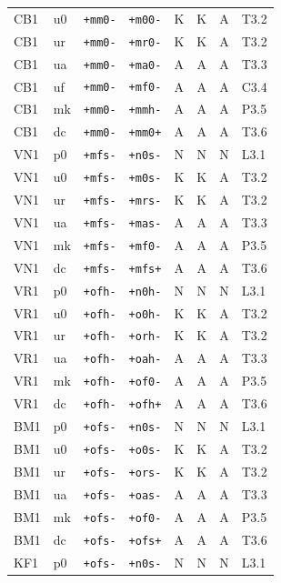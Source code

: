 {\begin{longtable}{@{}llllcccl@{}}
CB1 & u0 & \texttt{+mm0-} & \texttt{+m00-} & K & K & A & T3.2 \\
CB1 & ur & \texttt{+mm0-} & \texttt{+mr0-} & K & K & A & T3.2 \\
CB1 & ua & \texttt{+mm0-} & \texttt{+ma0-} & A & A & A & T3.3 \\
CB1 & uf & \texttt{+mm0-} & \texttt{+mf0-} & A & A & A & C3.4 \\
CB1 & mk & \texttt{+mm0-} & \texttt{+mmh-} & A & A & A & P3.5 \\
CB1 & dc & \texttt{+mm0-} & \texttt{+mm0+} & A & A & A & T3.6 \\
VN1 & p0 & \texttt{+mfs-} & \texttt{+n0s-} & N & N & N & L3.1 \\
VN1 & u0 & \texttt{+mfs-} & \texttt{+m0s-} & K & K & A & T3.2 \\
VN1 & ur & \texttt{+mfs-} & \texttt{+mrs-} & K & K & A & T3.2 \\
VN1 & ua & \texttt{+mfs-} & \texttt{+mas-} & A & A & A & T3.3 \\
VN1 & mk & \texttt{+mfs-} & \texttt{+mf0-} & A & A & A & P3.5 \\
VN1 & dc & \texttt{+mfs-} & \texttt{+mfs+} & A & A & A & T3.6 \\
VR1 & p0 & \texttt{+ofh-} & \texttt{+n0h-} & N & N & N & L3.1 \\
VR1 & u0 & \texttt{+ofh-} & \texttt{+o0h-} & K & K & A & T3.2 \\
VR1 & ur & \texttt{+ofh-} & \texttt{+orh-} & K & K & A & T3.2 \\
VR1 & ua & \texttt{+ofh-} & \texttt{+oah-} & A & A & A & T3.3 \\
VR1 & mk & \texttt{+ofh-} & \texttt{+of0-} & A & A & A & P3.5 \\
VR1 & dc & \texttt{+ofh-} & \texttt{+ofh+} & A & A & A & T3.6 \\
BM1 & p0 & \texttt{+ofs-} & \texttt{+n0s-} & N & N & N & L3.1 \\
BM1 & u0 & \texttt{+ofs-} & \texttt{+o0s-} & K & K & A & T3.2 \\
BM1 & ur & \texttt{+ofs-} & \texttt{+ors-} & K & K & A & T3.2 \\
BM1 & ua & \texttt{+ofs-} & \texttt{+oas-} & A & A & A & T3.3 \\
BM1 & mk & \texttt{+ofs-} & \texttt{+of0-} & A & A & A & P3.5 \\
BM1 & dc & \texttt{+ofs-} & \texttt{+ofs+} & A & A & A & T3.6 \\
KF1 & p0 & \texttt{+ofs-} & \texttt{+n0s-} & N & N & N & L3.1 \\

\end{longtable}}
